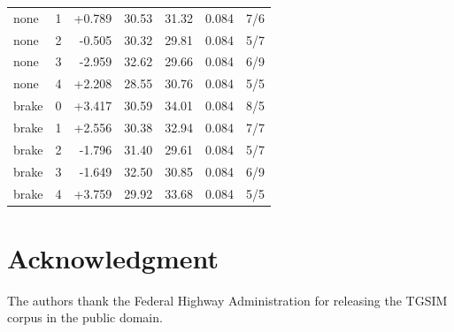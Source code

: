 \documentclass[journal]{IEEEtran}
\begin{document}
\begin{center}
\begin{center}
\begin{tabular}{lrrrrrr}
none & 1 & +0.789 & 30.53 & 31.32 & 0.084 & 7/6 \\
none & 2 & -0.505 & 30.32 & 29.81 & 0.084 & 5/7 \\
none & 3 & -2.959 & 32.62 & 29.66 & 0.084 & 6/9 \\
none & 4 & +2.208 & 28.55 & 30.76 & 0.084 & 5/5 \\
brake & 0 & +3.417 & 30.59 & 34.01 & 0.084 & 8/5 \\
brake & 1 & +2.556 & 30.38 & 32.94 & 0.084 & 7/7 \\
brake & 2 & -1.796 & 31.40 & 29.61 & 0.084 & 5/7 \\
brake & 3 & -1.649 & 32.50 & 30.85 & 0.084 & 6/9 \\
brake & 4 & +3.759 & 29.92 & 33.68 & 0.084 & 5/5 \\
\hline
\end{tabular}
\end{center}

\end{center}


\section*{Acknowledgment}
The authors thank the Federal Highway Administration for releasing the TGSIM corpus in the public domain.
\end{document}
